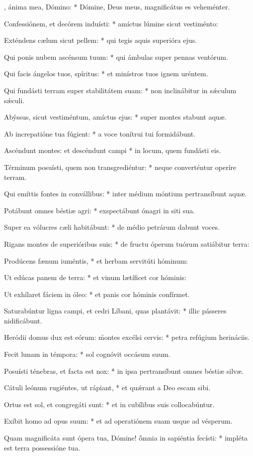 \begin{psalmus}

, ánima mea, Dómino: * Dómine, Deus meus, magnificátus es veheménter.

Confessiónem, et decórem induísti: * amíctus lúmine sicut vestiménto:

Exténdens cælum sicut pellem: * qui tegis aquis superióra ejus.

Qui ponis nubem ascénsum tuum: * qui ámbulas super pennas ventórum.

Qui facis ángelos tuos, spíritus: * et minístros tuos ignem uréntem.

Qui fundásti terram super stabilitátem suam: * non inclinábitur in sǽculum sǽculi.

Abýssus, sicut vestiméntum, amíctus ejus: * super montes stabunt aquæ.

Ab increpatióne tua fúgient: * a voce tonítrui tui formidábunt.

Ascéndunt montes: et descéndunt campi * in locum, quem fundásti eis.

Términum posuísti, quem non transgrediéntur: * neque converténtur operíre terram.

Qui emíttis fontes in convállibus: * inter médium móntium pertransíbunt aquæ.

Potábunt omnes béstiæ agri: * exspectábunt ónagri in siti sua.

Super ea vólucres cæli habitábunt: * de médio petrárum dabunt voces.

Rigans montes de superióribus suis: * de fructu óperum tuórum satiábitur terra:

Prodúcens fænum iuméntis, * et herbam servitúti hóminum:

Ut edúcas panem de terra: * et vinum lætíficet cor hóminis:

Ut exhílaret fáciem in óleo: * et panis cor hóminis confírmet.

Saturabúntur ligna campi, et cedri Líbani, quas plantávit: * illic pásseres nidificábunt.

Heródii domus dux est eórum: \f montes excélsi cervis: * petra refúgium herináciis.

Fecit lunam in témpora: * sol cognóvit occásum suum.

Posuísti ténebras, et facta est nox: * in ipsa pertransíbunt omnes béstiæ silvæ.

Cátuli leónum rugiéntes, ut rápiant, * et quǽrant a Deo escam sibi.

Ortus est sol, et congregáti sunt: * et in cubílibus suis collocabúntur.

Exíbit homo ad opus suum: * et ad operatiónem suam usque ad vésperum.

Quam magnificáta sunt ópera tua, Dómine! \f ómnia in sapiéntia fecísti: * impléta est terra possessióne tua.

\end{psalmus}
